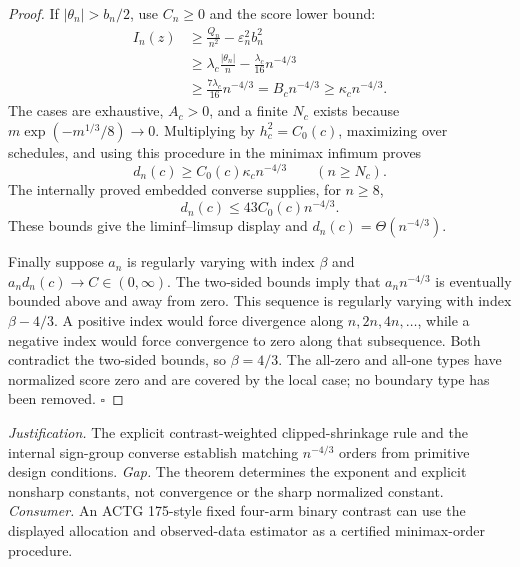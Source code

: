 \documentclass{article}
\begin{document}
\begin{proof}
If \(|\theta_n|>b_n/2\), use \(C_n\geq0\) and the score lower bound:
\[
 \begin{aligned}
 I_n(z)&\geq\frac{Q_n}{n^2}-\varepsilon_n^2b_n^2\\
 &\geq\lambda_c\frac{|\theta_n|}{n}-\frac{\lambda_c}{16}n^{-4/3}\\
 &\geq\frac{7\lambda_c}{16}n^{-4/3}
 =B_cn^{-4/3}\geq\kappa_cn^{-4/3}.
 \end{aligned}
\]
The cases are exhaustive, \(A_c>0\), and a finite \(N_c\) exists because \(m\exp(-m^{1/3}/8)\to0\). Multiplying by \(h_c^2=C_0(c)\), maximizing over schedules, and using this procedure in the minimax infimum proves
\[
 d_n(c)\geq C_0(c)\kappa_cn^{-4/3}
 \qquad(n\geq N_c).
\]
The internally proved embedded converse supplies, for \(n\geq8\),
\[
 d_n(c)\leq43C_0(c)n^{-4/3}.
\]
These bounds give the liminf--limsup display and \(d_n(c)=\Theta(n^{-4/3})\).

Finally suppose \(a_n\) is regularly varying with index \(\beta\) and \(a_nd_n(c)\to C\in(0,\infty)\). The two-sided bounds imply that \(a_nn^{-4/3}\) is eventually bounded above and away from zero. This sequence is regularly varying with index \(\beta-4/3\). A positive index would force divergence along \(n,2n,4n,\ldots\), while a negative index would force convergence to zero along that subsequence. Both contradict the two-sided bounds, so \(\beta=4/3\). The all-zero and all-one types have normalized score zero and are covered by the local case; no boundary type has been removed. \(\square\)
\end{proof}
\par\smallskip\noindent \textit{Justification.} The explicit contrast-weighted clipped-shrinkage rule and the internal sign-group converse establish matching \(n^{-4/3}\) orders from primitive design conditions. \textit{Gap.} The theorem determines the exponent and explicit nonsharp constants, not convergence or the sharp normalized constant. \textit{Consumer.} An ACTG 175-style fixed four-arm binary contrast can use the displayed allocation and observed-data estimator as a certified minimax-order procedure.
\end{document}
